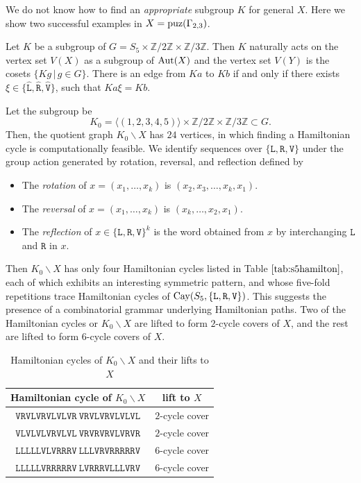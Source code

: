 \documentclass[lualatex,11pt]{article}
\begin{document}
We do not know how to find an {\em appropriate} subgroup $K$ for general $X$.
Here we show two successful examples in $X={\rm puz}(\Gamma_{2,3})$.

Let $K$ be a subgroup of $G=S_5\times {\mathbb Z}/2{\mathbb Z} \times {\mathbb Z}/3{\mathbb Z}$.
Then $K$ naturally acts on the vertex set $V(X)$ as a subgroup
of ${\rm Aut}(X)$ and the vertex set $V(Y)$
is the cosets $\{Kg \,|\, g\in G\}$.
There is an edge from $Ka$ to $Kb$
if and only if there exists $\xi \in \{\hat{\mathtt L}, \hat{\mathtt R}, \hat{\mathtt V}\}$,
such that $Ka\xi = Kb$.

Let the subgroup be
\[
 K_0=\langle(1,2,3,4,5)\rangle\times {\mathbb Z}/2{{\mathbb Z}} \times {\mathbb Z}/3{\mathbb Z}
 \subset G.
\]
Then, the quotient graph  $K_0\backslash{X}$ has $24$ vertices,
in which finding a Hamiltonian cycle is computationally feasible.
We identify sequences over  $\{{\mathtt L}, {\mathtt R}, {\mathtt V}\}$
under the group action generated by
rotation, reversal, and reflection defined by
\begin{itemize}
 \item The {\em rotation} of $x=(x_1,\ldots, x_k)$ is $(x_2, x_3,\ldots, x_k, x_1)$.
 \item The {\em reversal} of $x=(x_1,\ldots, x_k)$ is $(x_k,\ldots, x_2, x_1)$.
 \item The {\em reflection} of $x\in \{{\mathtt L}, {\mathtt R}, {\mathtt V}\}^k$ is the word obtained from $x$ by interchanging ${\mathtt L}$ and ${\mathtt R}$ in $x$.
\end{itemize}
Then $K_0\backslash X$ has only four Hamiltonian cycles listed in Table $\ref{tab:s5hamilton}$,
each of which exhibits an 
interesting symmetric pattern, and 
whose five-fold repetitions
trace Hamiltonian cycles
of ${\rm Cay}(S_5,\{{\mathtt L} , {\mathtt R}, {\mathtt V}\})$.
This suggests the presence of
a combinatorial grammar underlying Hamiltonian paths.
Two of the Hamiltonian cycles or $K_0\backslash{X}$
are lifted to form $2$-cycle covers of $X$, and the rest are
lifted to form $6$-cycle covers of $X$.

\begin{table}[H]
 \begin{center}
  \begin{tabular}{c|c}
   Hamiltonian cycle of $K_0\backslash{X}$ & lift to $X$\\
   \hline
   $\mathtt{VRVLVRVLVLVR ~ VRVLVRVLVLVL}$ & $2$-cycle cover \\
   $\mathtt{VLVLVLVRVLVL ~ VRVRVRVLVRVR}$ & $2$-cycle cover \\
   $\mathtt{LLLLLVLVRRRV ~ LLLVRVRRRRRV}$ & $6$-cycle cover \\
   $\mathtt{LLLLLVRRRRRV ~ LVRRRVLLLVRV}$ & $6$-cycle cover \\
  \end{tabular}
  \caption{Hamiltonian cycles of $K_0\backslash{X}$ and their lifts to $X$}
  \label{tab:s5hamilton}
 \end{center}
\end{table}
\end{document}
